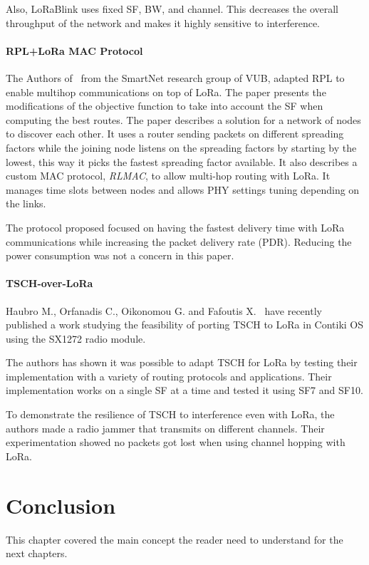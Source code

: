 
Also, LoRaBlink uses fixed SF, BW, and channel. This decreases the overall throughput
of the network and makes it highly sensitive to interference.

\paragraph{RPL+LoRa MAC Protocol}

The Authors of~\cite{8115756} from the SmartNet research group of VUB, adapted RPL
to enable multihop communications on top of LoRa.
The paper presents the modifications of the objective function to take into
account the SF when computing the best routes.
The paper describes a solution for a network of nodes to discover each other.
It uses a router sending packets on different spreading factors while the joining
node listens on the spreading factors by starting by the lowest, this way it
picks the fastest spreading factor available.
It also describes a custom MAC protocol, \emph{RLMAC}, to allow multi-hop
routing with LoRa. It manages time slots between nodes and allows PHY settings
tuning depending on the links.

The protocol proposed focused on having the fastest delivery time with LoRa
communications while increasing the packet delivery rate (PDR).
Reducing the power consumption was not a concern in this paper.


\paragraph{TSCH-over-LoRa}

Haubro M., Orfanadis C., Oikonomou G. and Fafoutis X.~\cite{tschoverlora}
have recently published a work studying the feasibility of porting TSCH to LoRa
in Contiki OS using the SX1272 radio module.

The authors has shown it was possible to adapt TSCH for LoRa by testing their
implementation with a variety of routing protocols and applications.
Their implementation works on a single SF at a time and tested it using
SF7 and SF10.

To demonstrate the resilience of TSCH to interference even with LoRa, the
authors made a radio jammer that transmits on different channels. Their
experimentation showed no packets got lost when using channel hopping with
LoRa.

\section{Conclusion}

This chapter covered the main concept the reader need to understand for the
next chapters.
